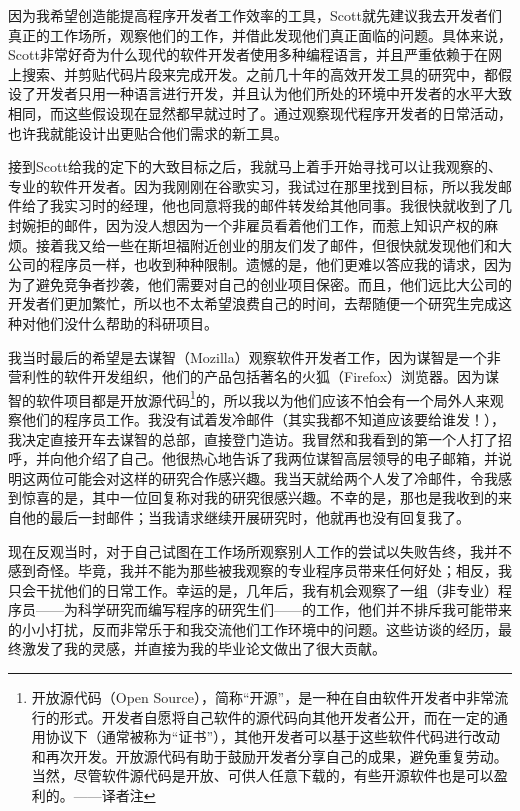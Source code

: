 \documentclass[letter,12pt]{book}
\begin{document}
\begin{CJK}{UTF8}{gbsn}
因为我希望创造能提高程序开发者工作效率的工具，Scott就先建议我去开发者们真正的工作场所，观察他们的工作，并借此发现他们真正面临的问题。具体来说，Scott非常好奇为什么现代的软件开发者使用多种编程语言，并且严重依赖于在网上搜索、并剪贴代码片段来完成开发。之前几十年的高效开发工具的研究中，都假设了开发者只用一种语言进行开发，并且认为他们所处的环境中开发者的水平大致相同，而这些假设现在显然都早就过时了。通过观察现代程序开发者的日常活动，也许我就能设计出更贴合他们需求的新工具。

接到Scott给我的定下的大致目标之后，我就马上着手开始寻找可以让我观察的、专业的软件开发者。因为我刚刚在谷歌实习，我试过在那里找到目标，所以我发邮件给了我实习时的经理，他也同意将我的邮件转发给其他同事。我很快就收到了几封婉拒的邮件，因为没人想因为一个非雇员看着他们工作，而惹上知识产权的麻烦。接着我又给一些在斯坦福附近创业的朋友们发了邮件，但很快就发现他们和大公司的程序员一样，也收到种种限制。遗憾的是，他们更难以答应我的请求，因为为了避免竞争者抄袭，他们需要对自己的创业项目保密。而且，他们远比大公司的开发者们更加繁忙，所以也不太希望浪费自己的时间，去帮随便一个研究生完成这种对他们没什么帮助的科研项目。

我当时最后的希望是去谋智（Mozilla）观察软件开发者工作，因为谋智是一个非营利性的软件开发组织，他们的产品包括著名的火狐（Firefox）浏览器。因为谋智的软件项目都是开放源代码\footnote{开放源代码（Open Source），简称“开源”，是一种在自由软件开发者中非常流行的形式。开发者自愿将自己软件的源代码向其他开发者公开，而在一定的通用协议下（通常被称为“证书”），其他开发者可以基于这些软件代码进行改动和再次开发。开放源代码有助于鼓励开发者分享自己的成果，避免重复劳动。当然，尽管软件源代码是开放、可供人任意下载的，有些开源软件也是可以盈利的。——译者注}的，所以我以为他们应该不怕会有一个局外人来观察他们的程序员工作。我没有试着发冷邮件（其实我都不知道应该要给谁发！），我决定直接开车去谋智的总部，直接登门造访。我冒然和我看到的第一个人打了招呼，并向他介绍了自己。他很热心地告诉了我两位谋智高层领导的电子邮箱，并说明这两位可能会对这样的研究合作感兴趣。我当天就给两个人发了冷邮件，令我感到惊喜的是，其中一位回复称对我的研究很感兴趣。不幸的是，那也是我收到的来自他的最后一封邮件；当我请求继续开展研究时，他就再也没有回复我了。

现在反观当时，对于自己试图在工作场所观察别人工作的尝试以失败告终，我并不感到奇怪。毕竟，我并不能为那些被我观察的专业程序员带来任何好处；相反，我只会干扰他们的日常工作。幸运的是，几年后，我有机会观察了一组（非专业）程序员——为科学研究而编写程序的研究生们——的工作，他们并不排斥我可能带来的小小打扰，反而非常乐于和我交流他们工作环境中的问题。这些访谈的经历，最终激发了我的灵感，并直接为我的毕业论文做出了很大贡献。


\end{CJK}
\end{document}
